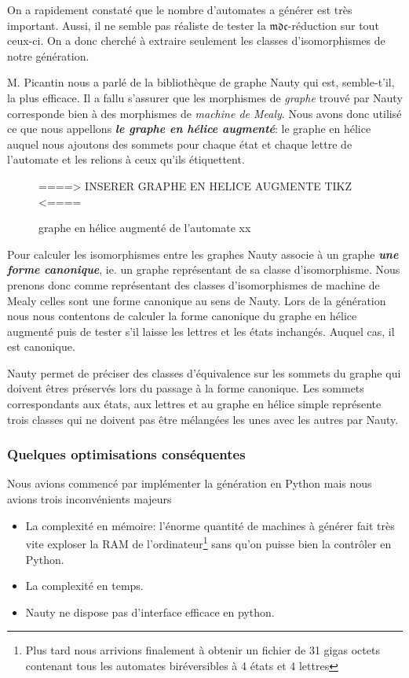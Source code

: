 \documentclass[11pt,a4paper]{article}
\begin{document}
On a rapidement constaté que le nombre d'automates a générer est très important. Aussi, il ne semble pas réaliste de tester la $\mathfrak{mdc}$-réduction sur tout ceux-ci. On a donc cherché à extraire seulement les classes d'isomorphismes de notre génération.

M. Picantin nous a parlé de la bibliothèque de graphe \textrm{Nauty} qui est, semble-t'il, la plus efficace. Il a fallu s'assurer que les morphismes de \textit{graphe} trouvé par \textrm{Nauty} corresponde bien à des morphismes de \textit{machine de Mealy}. Nous avons donc utilisé ce que nous appellons \textit{\textbf{le graphe en hélice augmenté}}: le graphe en hélice auquel nous ajoutons des sommets pour chaque état et chaque lettre de l'automate et les relions à ceux qu'ils étiquettent.

\begin{center}
  \begin{figure}[h]
    ====> INSERER GRAPHE EN HELICE AUGMENTE TIKZ <====
    \caption{graphe en hélice augmenté de l'automate xx}
  \end{figure}
\end{center}

Pour calculer les isomorphismes entre les graphes \textrm{Nauty} associe à un graphe \textit{\textbf{une forme canonique}}, ie. un graphe représentant de sa classe d'isomorphisme. Nous prenons donc comme représentant des classes d'isomorphismes de machine de Mealy celles sont une forme canonique au sens de \textrm{Nauty}. Lors de la génération nous nous contentons de calculer la forme canonique du graphe en hélice augmenté puis de tester s'il laisse les lettres et les états inchangés. Auquel cas, il est canonique.

Nauty permet de préciser des classes d'équivalence sur les sommets du graphe qui doivent êtres préservés lors du passage à la forme canonique. Les sommets correspondants aux états, aux lettres et au graphe en hélice simple représente trois classes qui ne doivent pas être mélangées les unes avec les autres par \textrm{Nauty}.

\subsubsection*{Quelques optimisations conséquentes}
Nous avions commencé par implémenter la génération en \textrm{Python} mais nous avions trois inconvénients majeurs
\begin{itemize}
\item La complexité en mémoire: l'énorme quantité de machines à générer fait très vite exploser la \textrm{RAM} de l'ordinateur\footnote{Plus tard nous arrivions finalement à obtenir un fichier de 31 gigas octets contenant tous les automates biréversibles à 4 états et 4 lettres} sans qu'on puisse bien la contrôler en Python.
\item La complexité en temps.
\item \textrm{Nauty} ne dispose pas d'interface efficace en python.
\end{itemize}
\end{document}
